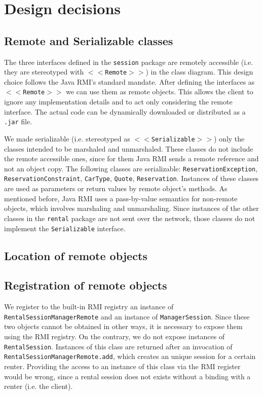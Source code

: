 \section{Design decisions}
\subsection{Remote and Serializable classes}
The three interfaces defined in the \texttt{session} package are remotely accessible (i.e. they are stereotyped with \texttt{$<<$Remote$>>$}) in the class diagram. This design choice follows the Java RMI's standard mandate. After defining the interfaces as \texttt{$<<$Remote$>>$} we can use them as remote objects. This allows the client to ignore any implementation details and to act only considering the remote interface. The actual code can be dynamically downloaded or distributed as a \texttt{.jar} file.

We made serializable (i.e. stereotyped as \texttt{$<<$Serializable$>>$}) only the classes intended to be marshaled and unmarshaled. These classes do not include the remote accessible ones, since for them Java RMI sends a remote reference and not an object copy. The following classes are serializable: \texttt{ReservationException}, \texttt{ReservationConstraint}, \texttt{CarType}, \texttt{Quote}, \texttt{Reservation}. Instances of these classes are used as parameters or return values by remote object's methods. As mentioned before, Java RMI uses a pass-by-value semantics for non-remote objects, which involves marshaling and unmarshaling. Since instances of the other classes in the \texttt{rental} package are not sent over the network, those classes do not implement the \texttt{Serializable} interface. 

\subsection{Location of remote objects} %

\subsection{Registration of remote objects}
We register to the built-in RMI registry an instance of \texttt{RentalSessionManagerRemote} and an instance of \texttt{ManagerSession}. Since these two objects cannot be obtained in other ways, it is necessary to expose them using the RMI registry. On the contrary, we do not expose instances of \texttt{RentalSession}. Instances of this class are returned after an invocation of \texttt{RentalSessionManagerRemote.add}, which creates an unique session for a certain renter. Providing the access to an instance of this class via the RMI register would be wrong, since a rental session does not exists without a binding with a renter (i.e. the client). 

